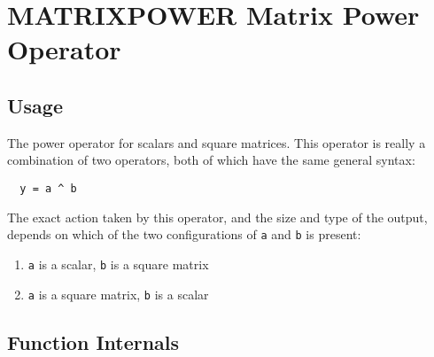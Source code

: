 \section{MATRIXPOWER Matrix Power Operator}

\subsection{Usage}

The power operator for scalars and square matrices.  This operator is really a 
combination of two operators, both of which have the same general syntax:
\begin{verbatim}
  y = a ^ b
\end{verbatim}
The exact action taken by this operator, and the size and type of the output, 
depends on which of the two configurations of \verb|a| and \verb|b| is present:
\begin{enumerate}
\item  \verb|a| is a scalar, \verb|b| is a square matrix

\item  \verb|a| is a square matrix, \verb|b| is a scalar

\end{enumerate}
\subsection{Function Internals}

